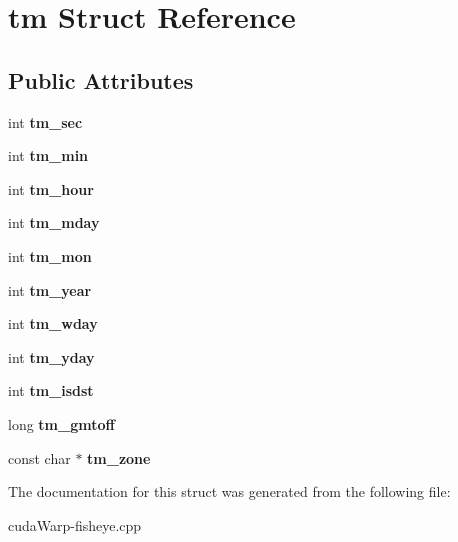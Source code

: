 \hypertarget{structtm}{}\section{tm Struct Reference}
\label{structtm}
\subsection*{Public Attributes}
\begin{DoxyCompactItemize}
\item 
int {\bfseries tm\+\_\+sec}\hypertarget{structtm_a4d098a9a5c03a00b2ee61e10851de81e}{}\label{structtm_a4d098a9a5c03a00b2ee61e10851de81e}

\item 
int {\bfseries tm\+\_\+min}\hypertarget{structtm_af414eb7c86cc3099595211eee4d4211b}{}\label{structtm_af414eb7c86cc3099595211eee4d4211b}

\item 
int {\bfseries tm\+\_\+hour}\hypertarget{structtm_a3e7ca4e37f1abcaf56b8a916c38eb9fe}{}\label{structtm_a3e7ca4e37f1abcaf56b8a916c38eb9fe}

\item 
int {\bfseries tm\+\_\+mday}\hypertarget{structtm_ab8d8904bad43b0c8b96e61941c5b5310}{}\label{structtm_ab8d8904bad43b0c8b96e61941c5b5310}

\item 
int {\bfseries tm\+\_\+mon}\hypertarget{structtm_a112ac36fa2f593777138a417cf031e17}{}\label{structtm_a112ac36fa2f593777138a417cf031e17}

\item 
int {\bfseries tm\+\_\+year}\hypertarget{structtm_a33adf78fd6476b2120ce3b9c4a852053}{}\label{structtm_a33adf78fd6476b2120ce3b9c4a852053}

\item 
int {\bfseries tm\+\_\+wday}\hypertarget{structtm_afe81a8c46f1c693c43f259b288859f4f}{}\label{structtm_afe81a8c46f1c693c43f259b288859f4f}

\item 
int {\bfseries tm\+\_\+yday}\hypertarget{structtm_a93a0ba77cc23796df84405dcbcc57eb1}{}\label{structtm_a93a0ba77cc23796df84405dcbcc57eb1}

\item 
int {\bfseries tm\+\_\+isdst}\hypertarget{structtm_a5645ca0580c8ab2c24f6c2965d9c9f9c}{}\label{structtm_a5645ca0580c8ab2c24f6c2965d9c9f9c}

\item 
long {\bfseries tm\+\_\+gmtoff}\hypertarget{structtm_a928f597df999fbfb7b88b1482ae656df}{}\label{structtm_a928f597df999fbfb7b88b1482ae656df}

\item 
const char $\ast$ {\bfseries tm\+\_\+zone}\hypertarget{structtm_a1b903718353b804011758faf372e5646}{}\label{structtm_a1b903718353b804011758faf372e5646}

\end{DoxyCompactItemize}


The documentation for this struct was generated from the following file\+:\begin{DoxyCompactItemize}
\item 
cuda\+Warp-\/fisheye.\+cpp\end{DoxyCompactItemize}
